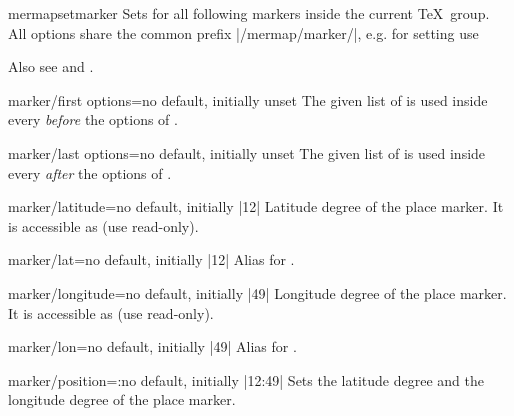\begin{docCommand}{mermapsetmarker}{}
  Sets  for all following markers inside the current \TeX\ group.
  All options share the common prefix |/mermap/marker/|, e.g. for setting
   use
  \begin{dispListing}
  \end{dispListing}
  Also see  and .
\end{docCommand}

\pagebreak

\begin{docMrcKey}{marker/first options}{=}{no default, initially unset}
  The given list of  is used inside every 
  \emph{before} the options of .
\end{docMrcKey}

\begin{docMrcKey}{marker/last options}{=}{no default, initially unset}
  The given list of  is used inside every 
  \emph{after} the options of .
\end{docMrcKey}

\begin{docMrcKey}{marker/latitude}{=}{no default, initially |12|}
  Latitude degree of the place marker.
  It is accessible as  (use read-only).
\end{docMrcKey}

\begin{docMrcKey}{marker/lat}{=}{no default, initially |12|}
  Alias for .
\end{docMrcKey}

\begin{docMrcKey}{marker/longitude}{=}{no default, initially |49|}
  Longitude degree of the place marker.
  It is accessible as  (use read-only).
\end{docMrcKey}

\begin{docMrcKey}{marker/lon}{=}{no default, initially |49|}
  Alias for .
\end{docMrcKey}

\begin{docMrcKey}{marker/position}{=:}{no default, initially |12:49|}
  Sets the latitude degree and the longitude degree of the place marker.
\end{docMrcKey}

